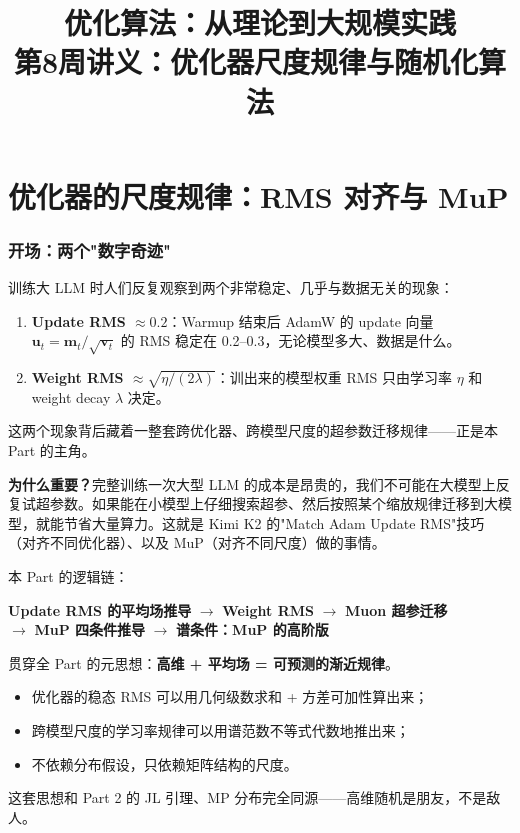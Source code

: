 \documentclass[11pt,a4paper]{ctexart}
\title{\textbf{优化算法：从理论到大规模实践} \\ \Large 第8周讲义：优化器尺度规律与随机化算法}
\author{}
\date{}
\theoremstyle{definition}
\theoremstyle{remark}
\begin{document}
 
\maketitle
\tableofcontents
\newpage
 

\part{优化器的尺度规律：RMS 对齐与 MuP}
 
\section{开场：两个"数字奇迹"}
 
训练大 LLM 时人们反复观察到两个非常稳定、几乎与数据无关的现象：
 
\begin{enumerate}
    \item \textbf{Update RMS $\approx 0.2$}：Warmup 结束后 AdamW 的 update 向量 $\bm{u}_t = \bm{m}_t/\sqrt{\bm{v}_t}$ 的 RMS 稳定在 0.2--0.3，无论模型多大、数据是什么。
    \item \textbf{Weight RMS $\approx \sqrt{\eta/(2\lambda)}$}：训出来的模型权重 RMS 只由学习率 $\eta$ 和 weight decay $\lambda$ 决定。
\end{enumerate}
 
这两个现象背后藏着一整套跨优化器、跨模型尺度的超参数迁移规律——正是本 Part 的主角。
 
\textbf{为什么重要？}完整训练一次大型 LLM 的成本是昂贵的，我们不可能在大模型上反复试超参数。如果能在小模型上仔细搜索超参、然后按照某个缩放规律迁移到大模型，就能节省大量算力。这就是 Kimi K2 的"Match Adam Update RMS"技巧（对齐不同优化器）、以及 MuP（对齐不同尺度）做的事情。
 
本 Part 的逻辑链：
\begin{center}
\textbf{Update RMS 的平均场推导} $\to$ \textbf{Weight RMS} $\to$ \textbf{Muon 超参迁移} \\
$\to$ \textbf{MuP 四条件推导} $\to$ \textbf{谱条件：MuP 的高阶版}
\end{center}
 
\begin{keyinsight}
贯穿全 Part 的元思想：\textbf{高维 + 平均场 = 可预测的渐近规律}。
\begin{itemize}
    \item 优化器的稳态 RMS 可以用几何级数求和 + 方差可加性算出来；
    \item 跨模型尺度的学习率规律可以用谱范数不等式代数地推出来；
    \item 不依赖分布假设，只依赖矩阵结构的尺度。
\end{itemize}
这套思想和 Part 2 的 JL 引理、MP 分布完全同源——高维随机是朋友，不是敌人。
\end{keyinsight}
 
\end{document}
